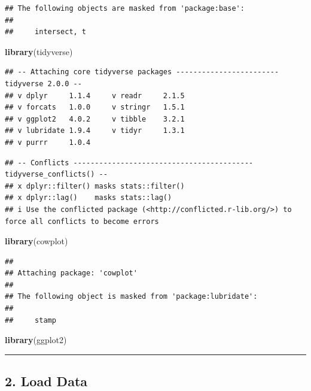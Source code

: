\documentclass[
]{article}
\newenvironment{Shaded}{\begin{snugshade}}{\end{snugshade}}
\newcommand{\FunctionTok}[1]{\textcolor[rgb]{0.13,0.29,0.53}{\textbf{#1}}}
\newcommand{\NormalTok}[1]{#1}
\begin{document}
\begin{verbatim}
## The following objects are masked from 'package:base':
## 
##     intersect, t
\end{verbatim}

\begin{Shaded}
\begin{Highlighting}[]
\FunctionTok{library}\NormalTok{(tidyverse)}
\end{Highlighting}
\end{Shaded}

\begin{verbatim}
## -- Attaching core tidyverse packages ------------------------ tidyverse 2.0.0 --
## v dplyr     1.1.4     v readr     2.1.5
## v forcats   1.0.0     v stringr   1.5.1
## v ggplot2   4.0.2     v tibble    3.2.1
## v lubridate 1.9.4     v tidyr     1.3.1
## v purrr     1.0.4
\end{verbatim}

\begin{verbatim}
## -- Conflicts ------------------------------------------ tidyverse_conflicts() --
## x dplyr::filter() masks stats::filter()
## x dplyr::lag()    masks stats::lag()
## i Use the conflicted package (<http://conflicted.r-lib.org/>) to force all conflicts to become errors
\end{verbatim}

\begin{Shaded}
\begin{Highlighting}[]
\FunctionTok{library}\NormalTok{(cowplot)}
\end{Highlighting}
\end{Shaded}

\begin{verbatim}
## 
## Attaching package: 'cowplot'
## 
## The following object is masked from 'package:lubridate':
## 
##     stamp
\end{verbatim}

\begin{Shaded}
\begin{Highlighting}[]
\FunctionTok{library}\NormalTok{(ggplot2)}
\end{Highlighting}
\end{Shaded}

\begin{center}\rule{0.5\linewidth}{0.5pt}\end{center}

\subsection{2. Load Data}\label{load-data}
\end{document}
